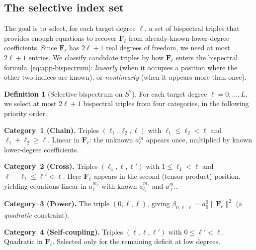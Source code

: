 \documentclass{article}
\theoremstyle{definition}
\newtheorem{definition}[theorem]{Definition}
\theoremstyle{remark}
\newcommand{\norm}[1]{\lVert #1 \rVert}
\newcommand{\conj}[1]{\overline{#1}}
\theoremstyle{definition}
\begin{document}
\subsection{The selective index set}

The goal is to select, for each target degree $\ell$, a set of
bispectral triples that provides enough equations to recover
$\mathbf{F}_\ell$ from already-known lower-degree coefficients. Since
$\mathbf{F}_\ell$ has $2\ell+1$ real degrees of freedom, we need at
most $2\ell+1$ entries. We classify candidate triples by how
$\mathbf{F}_\ell$ enters the bispectral formula~\eqref{eq:app-bispectrum}:
\emph{linearly} (when it occupies a position where the other two
indices are known), or \emph{nonlinearly} (when it appears more than
once).

\begin{definition}[Selective bispectrum on $S^2$]\label{def:app-selective}
For each target degree $\ell = 0, \dotsc, L$, we select at most
$2\ell+1$ bispectral triples from four categories, in the following
priority order.

\medskip
\noindent\textbf{Category~1 (Chain).}
Triples $(\ell_1, \ell_2, \ell)$ with
$\ell_1 \le \ell_2 < \ell$ and $\ell_1 + \ell_2 \ge \ell$.
Linear in $\mathbf{F}_\ell$: the unknown
$\conj{a_\ell^m}$ appears once, multiplied by known lower-degree
coefficients.

\medskip
\noindent\textbf{Category~2 (Cross).}
Triples $(\ell_1, \ell, \ell')$ with
$1 \le \ell_1 < \ell$ and $\ell - \ell_1 \le \ell' < \ell$.
Here $\mathbf{F}_\ell$ appears in the second (tensor-product) position,
yielding equations linear in $a_\ell^{m_2}$ with known $a_{\ell_1}^{m_1}$
and $a_{\ell'}^{m}$.

\medskip
\noindent\textbf{Category~3 (Power).}
The triple $(0, \ell, \ell)$, giving
$\beta_{0,\ell,\ell} = a_0^0 \norm{\mathbf{F}_\ell}^2$
(a \emph{quadratic} constraint).

\medskip
\noindent\textbf{Category~4 (Self-coupling).}
Triples $(\ell, \ell, \ell')$ with $0 \le \ell' < \ell$.
Quadratic in $\mathbf{F}_\ell$. Selected only for the remaining deficit
at low degrees.
\end{definition}
\end{document}
